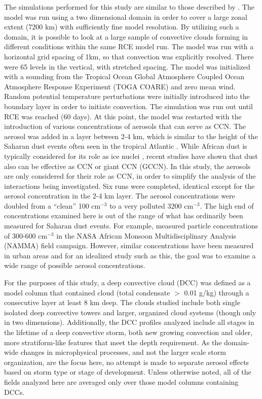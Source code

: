 The simulations performed for this study are similar to those described by \citet{VanDenHeever:2011p7996}.  The model was run using a two dimensional domain in order to cover a large zonal extent (7200 km) with sufficiently fine model resolution.  By utilizing such a domain, it is possible to look at a large sample of convective clouds forming in different conditions within the same RCE model run.  The model was run with a horizontal grid spacing of 1km, so that convection was explicitly resolved.  There were 65 levels in the vertical, with stretched spacing.  The model was initialized with a sounding from the Tropical Ocean Global Atmosphere Coupled Ocean Atmosphere Response Experiment (TOGA COARE) and zero mean wind.  Random potential temperature perturbations were initially introduced into the boundary layer in order to initiate convection.  The simulation was run out until RCE was reached (60 days).  At this point, the model was restarted with the introduction of various concentrations of aerosols that can serve as CCN.  The aerosol was added in a layer between 2-4 km, which is similar to the height of the Saharan dust events often seen in the tropical Atlantic \citep{carlsonsal,dustobs}.  While African dust is typically considered for its role as ice nuclei \citep{Demott:2003p8885}, recent studies \citep{Twohy:2009p8884} have shown that dust also can be effective as CCN or giant CCN (GCCN).  In this study, the aerosols are only considered for their role as CCN, in order to simplify the analysis of the interactions being investigated.  Six runs were completed, identical except for the aerosol concentration in the 2-4 km layer.  The aerosol concentrations were doubled from a ``clean'' 100 cm$^{-3}$ to a very polluted 3200 cm$^{-3}$.  The high end of concentrations examined here is out of the range of what has ordinarily been measured for Saharan dust events. For example, \citet{Zipser:2009p7664} measured particle concentrations of 300-600 cm$^{-3}$ in the NASA African Monsoon Multidisciplinary Analysis (NAMMA) field campaign. However, similar concentrations have been measured in urban areas \citep[e.g. China, as described in][]{Rose:2010p8886} and for an idealized study such as this, the goal was to examine a wide range of possible aerosol concentrations. 

For the purposes of this study, a deep convective cloud (DCC) was defined as a model column that contained cloud (total condensate $>$ 0.01 g/kg) through a consecutive layer at least 8 km deep.  The clouds studied include both single isolated deep convective towers and larger, organized cloud systems (though only in two dimensions).  Additionally, the DCC profiles analyzed include all stages in the lifetime of a deep convective storm, both new growing convection and older, more stratiform-like features that meet the depth requirement.  As the domain-wide changes in microphysical processes, and not the larger scale storm organization, are the focus here, no attempt is made to separate aerosol effects based on storm type or stage of development.  Unless otherwise noted, all of the fields analyzed here are averaged only over those model columns containing DCCs.


